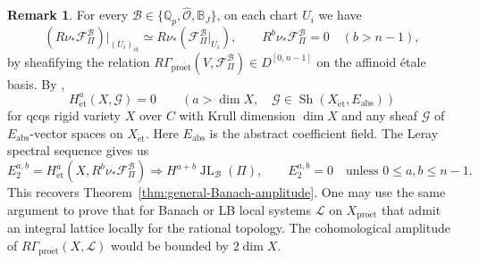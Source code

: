 \documentclass[11pt]{article}
\theoremstyle{definition}
\newtheorem{remark}[theorem]{Remark}
\newcommand{\Qp}{\mathbb Q_p}
\newcommand{\cF}{\mathcal F}
\newcommand{\cL}{\mathcal L}
\newcommand{\proet}{\mathrm{pro\acute et}}
\newcommand{\et}{\mathrm{\acute et}}
\newcommand{\JL}{\operatorname{JL}}
\begin{document}
\begin{remark}%
\label{rem:AGV-globalization}
For every \(\mathscr B\in\{\Qp,\widehat{\mathscr O},\mathbb B_J\}\),
on each chart $U_i$ we have 
\[
 (R\nu_*\cF_\Pi^{\mathscr B})|_{(U_i)_{\et}}
 \simeq R\nu_*(\cF_\Pi^{\mathscr B}|_{U_i}),\qquad
 R^b\nu_*\cF_\Pi^{\mathscr B}=0\quad(b>n-1),
\]
by sheafifying the relation $R\Gamma_{\proet}(V,\cF_\Pi^{\mathscr B})
 \in D^{[0,n-1]}$
on the affinoid \'etale basis.  By
\cite[Corollary~2.4.13]{AyoubGallauerVezzani},
\begin{equation}\label{eq:rational-etale-cd-input}
 H^a_{\et}(X,\mathcal G)=0\qquad
 \left(a>\dim X,\quad
 \mathcal G\in\operatorname{Sh}(X_{\et},E_{\mathrm{abs}})\right)
\end{equation}for qcqs rigid variety $X$ over $C$ with Krull dimension $\dim X$ and any sheaf $\mathcal G$ of $E_{\mathrm{abs}}$-vector spaces on $X_{\et}$.
Here \(E_{\mathrm{abs}}\) is the abstract coefficient field.
The Leray spectral sequence \cite[Tag~0732]{Stacks} gives us
\[
 E_2^{a,b}=H^a_{\et}(X,R^b\nu_*\cF_\Pi^{\mathscr B})
 \Longrightarrow H^{a+b}\JL_{\mathscr B}(\Pi),\qquad
 E_2^{a,b}=0\quad\text{unless }0\leq a,b\leq n-1.
\]
This recovers Theorem~\ref{thm:general-Banach-amplitude}.
One may use the same argument to prove that for Banach or LB local systems \(\mathcal L\)
on \(X_{\proet}\) that admit an integral lattice locally for the rational topology. 
The cohomological amplitude of $R\Gamma_{\proet}(X, \cL)$ would be bounded by \(2\dim X\).
\end{remark}
\end{document}
